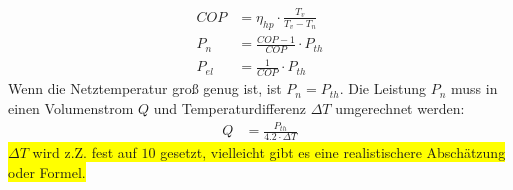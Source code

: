 \documentclass[12pt,a4paper]{article}
\begin{document}
\begin{align}
    COP &= \eta_{hp}\cdot \frac{T_{v}}{T_{v}-T_{n}}\\
    P_{n} &= \frac{COP-1}{COP}\cdot P_{th}\\
    P_{el} &= \frac{1}{COP}\cdot P_{th}
\end{align}
Wenn die Netztemperatur groß genug ist, ist $P_{n}=P_{th}$.
Die Leistung $P_{n}$ muss in einen Volumenstrom $Q$ und Temperaturdifferenz $\Delta T$ umgerechnet werden:
\begin{align}
    Q &= \frac{P_{th}}{4.2\cdot\Delta T}
\end{align}
\colorbox{Yellow}{$\Delta T$  wird z.Z. fest auf $10$ gesetzt, vielleicht gibt es eine realistischere Abschätzung oder Formel.}
\end{document}

